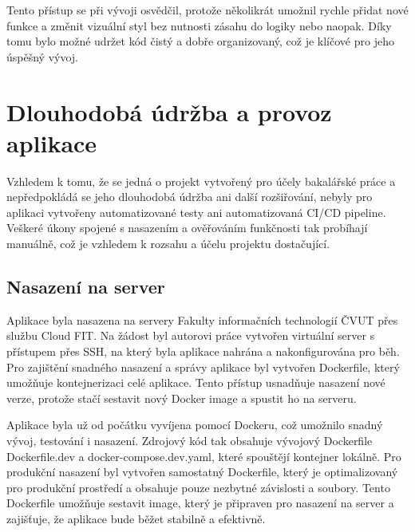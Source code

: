 Tento přístup se při vývoji osvědčil, protože několikrát umožnil rychle přidat nové funkce a změnit vizuální styl bez nutnosti zásahu do logiky nebo naopak. Díky tomu bylo možné udržet kód čistý a dobře organizovaný, což je klíčové pro jeho úspěšný vývoj.

\section{Dlouhodobá údržba a provoz aplikace}
\label{sec:app_provoz}


Vzhledem k tomu, že se jedná o projekt vytvořený pro účely bakalářské práce a nepředpokládá se jeho dlouhodobá údržba ani další rozšiřování, nebyly pro aplikaci vytvořeny automatizované testy ani automatizovaná CI/CD pipeline. Veškeré úkony spojené s nasazením a ověřováním funkčnosti tak probíhají manuálně, což je vzhledem k rozsahu a účelu projektu dostačující.

\subsection{Nasazení na server}
\label{subsec:app_nasazeni}

Aplikace byla nasazena na servery Fakulty informačních technologií ČVUT přes službu Cloud FIT. Na žádost byl autorovi práce vytvořen virtuální server s přístupem přes SSH, na který byla aplikace nahrána a nakonfigurována pro běh. Pro zajištění snadného nasazení a správy aplikace byl vytvořen Dockerfile, který umožňuje kontejnerizaci celé aplikace. Tento přístup usnadňuje nasazení nové verze, protože stačí sestavit nový Docker image a spustit ho na serveru.

Aplikace byla už od počátku vyvíjena pomocí Dockeru, což umožnilo snadný vývoj, testování i nasazení. Zdrojový kód tak obsahuje vývojový Dockerfile Dockerfile.dev a docker-compose.dev.yaml, které spouštějí kontejner lokálně. Pro produkční nasazení byl vytvořen samostatný Dockerfile, který je optimalizovaný pro produkční prostředí a obsahuje pouze nezbytné závislosti a soubory. Tento Dockerfile umožňuje sestavit image, který je připraven pro nasazení na server a zajišťuje, že aplikace bude běžet stabilně a efektivně.

